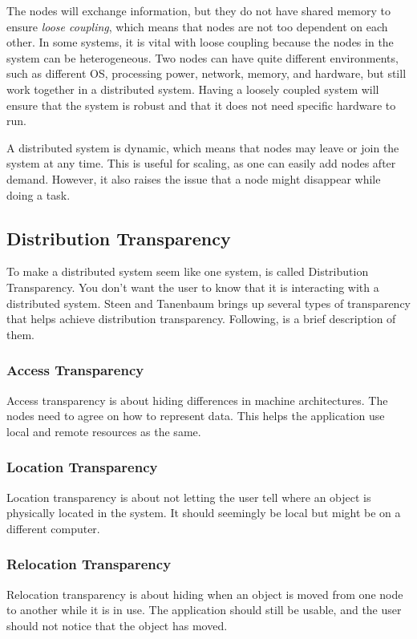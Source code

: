 The nodes will exchange information, but they do not have shared memory to ensure \textit{loose coupling}, which means that nodes are not too dependent on each other. In some systems, it is vital with loose coupling because the nodes in the system can be heterogeneous. Two nodes can have quite different environments, such as different OS, processing power, network, memory, and hardware, but still work together in a distributed system. Having a loosely coupled system will ensure that the system is robust and that it does not need specific hardware to run.

A distributed system is dynamic, which means that nodes may leave or join the system at any time. This is useful for scaling, as one can easily add nodes after demand. However, it also raises the issue that a node might disappear while doing a task.



\subsection{Distribution Transparency}
To make a distributed system seem like one system, is called Distribution Transparency. You don't want the user to know that it is interacting with a distributed system. Steen and Tanenbaum\cite{steen_distributed_2017} brings up several types of transparency that helps achieve distribution transparency. Following, is a brief description of them.

\subsubsection{Access Transparency}
Access transparency is about hiding differences in machine architectures. The nodes need to agree on how to represent data. This helps the application use local and remote resources as the same. 

\subsubsection{Location Transparency}
Location transparency is about not letting the user tell where an object is physically located in the system. It should seemingly be local but might be on a different computer.

\subsubsection{Relocation Transparency}
Relocation transparency is about hiding when an object is moved from one node to another while it is in use. The application should still be usable, and the user should not notice that the object has moved.

